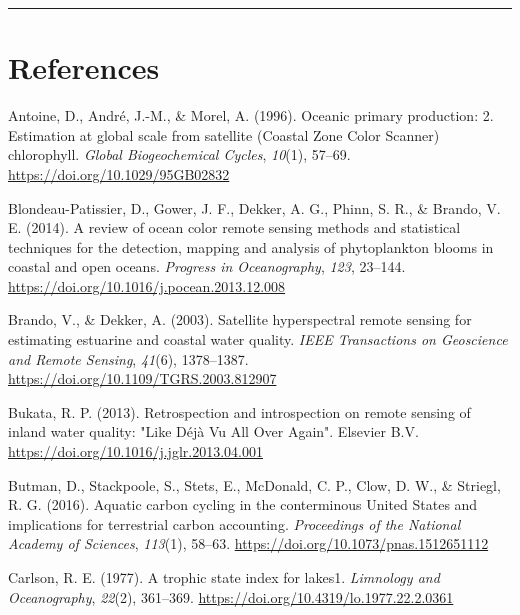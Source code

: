 \documentclass[]{article}
\begin{document}
\begin{center}\rule{0.5\linewidth}{\linethickness}\end{center}

\hypertarget{references}{%
\section*{References}\label{references}}

\hypertarget{refs}{}
\leavevmode\hypertarget{ref-Antoine1996}{}%
Antoine, D., André, J.-M., \& Morel, A. (1996). Oceanic primary
production: 2. Estimation at global scale from satellite (Coastal Zone
Color Scanner) chlorophyll. \emph{Global Biogeochemical Cycles},
\emph{10}(1), 57--69. \url{https://doi.org/10.1029/95GB02832}

\leavevmode\hypertarget{ref-Blondeau-Patissier2014}{}%
Blondeau-Patissier, D., Gower, J. F., Dekker, A. G., Phinn, S. R., \&
Brando, V. E. (2014). A review of ocean color remote sensing methods and
statistical techniques for the detection, mapping and analysis of
phytoplankton blooms in coastal and open oceans. \emph{Progress in
Oceanography}, \emph{123}, 23--144.
\url{https://doi.org/10.1016/j.pocean.2013.12.008}

\leavevmode\hypertarget{ref-Brando2003}{}%
Brando, V., \& Dekker, A. (2003). Satellite hyperspectral remote sensing
for estimating estuarine and coastal water quality. \emph{IEEE
Transactions on Geoscience and Remote Sensing}, \emph{41}(6),
1378--1387. \url{https://doi.org/10.1109/TGRS.2003.812907}

\leavevmode\hypertarget{ref-Bukata2013}{}%
Bukata, R. P. (2013). Retrospection and introspection on remote sensing
of inland water quality: "Like Déjà Vu All Over Again". Elsevier B.V.
\url{https://doi.org/10.1016/j.jglr.2013.04.001}

\leavevmode\hypertarget{ref-Butman2016}{}%
Butman, D., Stackpoole, S., Stets, E., McDonald, C. P., Clow, D. W., \&
Striegl, R. G. (2016). Aquatic carbon cycling in the conterminous United
States and implications for terrestrial carbon accounting.
\emph{Proceedings of the National Academy of Sciences}, \emph{113}(1),
58--63. \url{https://doi.org/10.1073/pnas.1512651112}

\leavevmode\hypertarget{ref-Carlson1977}{}%
Carlson, R. E. (1977). A trophic state index for lakes1. \emph{Limnology
and Oceanography}, \emph{22}(2), 361--369.
\url{https://doi.org/10.4319/lo.1977.22.2.0361}
\end{document}
